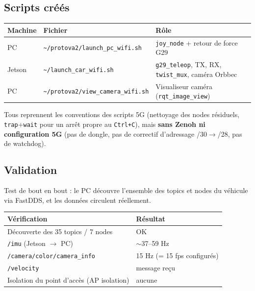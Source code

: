 \documentclass[a4paper,11pt]{article}
\begin{document}
\subsection{Scripts créés}
\begin{table}[H]
\centering
\begin{tabularx}{\textwidth}{@{}l l X@{}}
\toprule
\textbf{Machine} & \textbf{Fichier} & \textbf{Rôle} \\
\midrule
PC     & \texttt{\textasciitilde/protova2/launch\_pc\_wifi.sh}  & \texttt{joy\_node} + retour de force G29 \\
Jetson & \texttt{\textasciitilde/launch\_car\_wifi.sh}          & \texttt{g29\_teleop}, TX, RX, \texttt{twist\_mux}, caméra Orbbec \\
PC     & \texttt{\textasciitilde/protova2/view\_camera\_wifi.sh}& Visualiseur caméra (\texttt{rqt\_image\_view}) \\
\bottomrule
\end{tabularx}
\end{table}
\noindent Tous reprennent les conventions des scripts 5G (nettoyage des nodes
résiduels, \texttt{trap}+\texttt{wait} pour un arrêt propre au \texttt{Ctrl+C}),
mais \textbf{sans Zenoh ni configuration 5G} (pas de dongle, pas de correctif
d'adressage /30$\rightarrow$/28, pas de watchdog).

\subsection{Validation}
Test de bout en bout : le PC découvre l'ensemble des topics et nodes du véhicule
via FastDDS, et les données circulent réellement.
\begin{center}
\begin{tabular}{@{}ll@{}}
\toprule
Vérification & Résultat \\
\midrule
Découverte des 35 topics / 7 nodes & \textcolor{success}{OK} \\
\texttt{/imu} (Jetson $\rightarrow$ PC) & $\sim$37--59 Hz \\
\texttt{/camera/color/camera\_info} & 15 Hz (= 15 fps configurés) \\
\texttt{/velocity} & message reçu \\
Isolation du point d'accès (AP isolation) & aucune \\
\bottomrule
\end{tabular}
\end{center}
\end{document}
